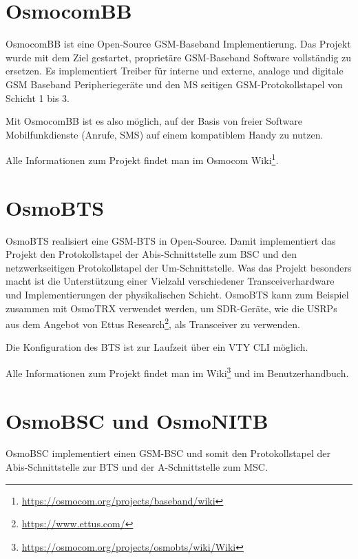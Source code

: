 \section{OsmocomBB} \label{hdl:grundlagen_osmocom_OsmocomBB}
OsmocomBB ist eine Open-Source \ac{GSM}-Baseband Implementierung. Das Projekt wurde mit dem Ziel gestartet, proprietäre \ac{GSM}-Baseband Software vollständig zu ersetzen. Es implementiert Treiber für interne und externe, analoge und digitale \ac{GSM} Baseband Peripheriegeräte und den \ac{MS} seitigen \ac{GSM}-Protokollstapel von Schicht 1 bis 3. \citep{osmocom:bb}

Mit OsmocomBB ist es also möglich, auf der Basis von freier Software Mobilfunkdienste (Anrufe, \ac{SMS}) auf einem kompatiblem Handy zu nutzen.

Alle Informationen zum Projekt findet man im Osmocom Wiki\footnote{\url{https://osmocom.org/projects/baseband/wiki}}.

\section{OsmoBTS} \label{hdl:grundlagen_osmocom_OsmoBTS}

OsmoBTS realisiert eine \ac{GSM}-\ac{BTS} in Open-Source. Damit implementiert das Projekt den Protokollstapel der Abis-Schnittstelle zum \ac{BSC} und den netzwerkseitigen Protokollstapel der \ac{Um}-Schnittstelle. Was das Projekt besonders macht ist die Unterstützung einer Vielzahl verschiedener Transceiverhardware und Implementierungen der physikalischen Schicht. OsmoBTS kann zum Beispiel zusammen mit OsmoTRX verwendet werden, um \ac{SDR}-Geräte, wie die \acp{USRP} aus dem Angebot von Ettus Research\footnote{\url{https://www.ettus.com/}}, als Transceiver zu verwenden. \citep[OsmoBTS Benutzerhandbuch]{osmocom:docs-latest}

Die Konfiguration des \ac{BTS} ist zur Laufzeit über ein \ac{VTY} \ac{CLI} möglich.

Alle Informationen zum Projekt findet man im Wiki\footnote{\url{https://osmocom.org/projects/osmobts/wiki/Wiki}} und im Benutzerhandbuch.

\section{OsmoBSC und OsmoNITB} \label{hdl:grundlagen_osmocom_OpenBSC}

OsmoBSC implementiert einen \ac{GSM}-\ac{BSC} und somit den Protokollstapel der Abis-Schnittstelle zur \ac{BTS} und der A-Schnittstelle zum \ac{MSC}. \citep[OsmoBSC Benutzerhandbuch]{osmocom:docs-latest}

